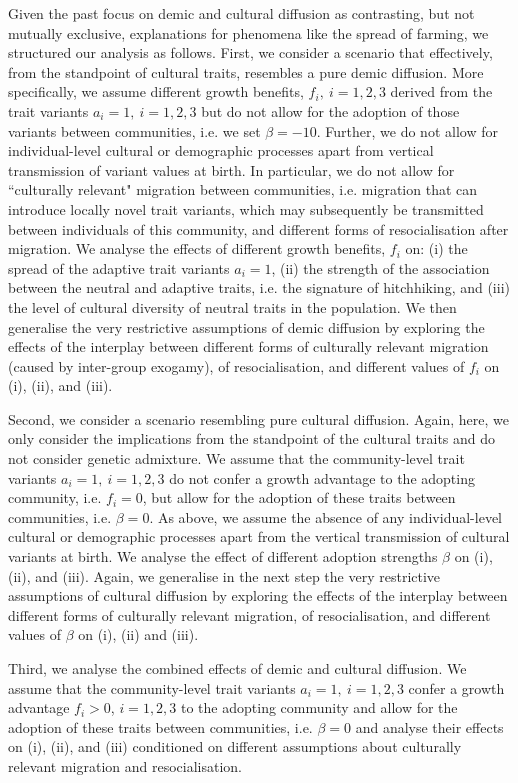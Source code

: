 \documentclass[9pt,twocolumn,twoside,lineno]{pnas-new}
\begin{document}
Given the past focus on demic and cultural diffusion as contrasting, but not mutually exclusive, explanations for phenomena like the spread of farming, we structured our analysis as follows. First, we consider a scenario that effectively, from the standpoint of cultural traits, resembles a pure demic diffusion. More specifically, we assume different growth benefits, $f_i,\ i=1,2,3$ derived from the trait variants $a_i=1,\ i=1,2,3$ but do not allow for the adoption of those variants between communities, i.e. we set $\beta=-10$. Further, we do not allow for individual-level cultural or demographic processes apart from vertical transmission of variant values at birth. In particular, we do not allow for ``culturally relevant" migration between communities, i.e. migration that can introduce locally novel trait variants, which may subsequently be transmitted between individuals of this community, and different forms of resocialisation after migration. We analyse the effects of different growth benefits, $f_i$ on: (i) the spread of the adaptive trait variants $a_i=1$, (ii) the strength of the association between the neutral and adaptive traits, i.e. the signature of hitchhiking, and (iii) the level of cultural diversity of neutral traits in the population. We then generalise the very restrictive assumptions of demic diffusion by exploring the effects of the interplay between different forms of culturally relevant migration (caused by inter-group exogamy), of resocialisation, and different values of $f_i$ on (i), (ii), and (iii). 

Second, we consider a scenario resembling pure cultural diffusion. Again, here, we only consider the implications from the standpoint of the cultural traits and do not consider genetic admixture. We assume that the community-level trait variants $a_i=1,\ i=1,2,3$ do not confer a growth advantage to the adopting community, i.e. $f_i=0$, but allow for the adoption of these traits between communities, i.e. $\beta=0$. As above, we assume the absence of any individual-level cultural or demographic processes apart from the vertical transmission of cultural variants at birth. We analyse the effect of different adoption strengths $\beta$ on (i), (ii), and (iii). Again, we generalise in the next step the very restrictive assumptions of cultural diffusion by exploring the effects of the interplay between different forms of culturally relevant migration, of resocialisation, and different values of $\beta$ on (i), (ii) and (iii).

Third, we analyse the combined effects of demic and cultural diffusion. We assume that the community-level trait variants $a_i=1,\ i=1,2,3$ confer a growth advantage $f_i>0$, $i=1,2,3$ to the adopting community and allow for the adoption of these traits between communities, i.e. $\beta=0$ and analyse their effects on (i), (ii), and (iii) conditioned on different assumptions about culturally relevant migration and resocialisation. 
\end{document}
